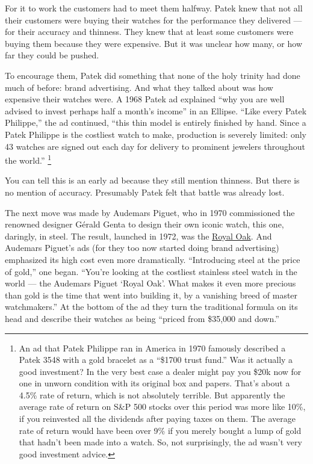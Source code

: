 For it to work the customers had to meet them halfway. Patek knew that
not all their customers were buying their watches for the performance
they delivered --- for their accuracy and thinness. They knew that at
least some customers were buying them because they were expensive. But
it was unclear how many, or how far they could be pushed.

To encourage them, Patek did something that none of the holy trinity had
done much of before: brand advertising. And what they talked about was
how expensive their watches were. A 1968 Patek ad explained ``why you
are well advised to invest perhaps half a month's income'' in an
Ellipse. ``Like every Patek Philippe,'' the ad continued, ``this thin
model is entirely finished by hand. Since a Patek Philippe is the
costliest watch to make, production is severely limited: only 43 watches
are signed out each day for delivery to prominent jewelers throughout
the world.'' \footnote{An ad that Patek Philippe ran in America in 1970 famously
described a Patek 3548 with a gold bracelet as a ``\$1700 trust fund.''
Was it actually a good investment? In the very best case a dealer might
pay you \$20k now for one in unworn condition with its original box and
papers. That's about a 4.5\% rate of return, which is not absolutely
terrible. But apparently the average rate of return on S\&P 500 stocks
over this period was more like 10\%, if you reinvested all the dividends
after paying taxes on them. The average rate of return would have been
over 9\% if you merely bought a lump of gold that hadn't been made into
a watch. So, not surprisingly, the ad wasn't very good investment
advice.}

You can tell this is an early ad because they still mention thinness.
But there is no mention of accuracy. Presumably Patek felt that battle
was already lost.

The next move was made by Audemars Piguet, who in 1970 commissioned the
renowned designer Gérald Genta to design their own iconic watch, this
one, daringly, in steel. The result, launched in 1972, was the
\href{https://www.sothebys.com/en/buy/auction/2025/fine-watches-5/reference-5402st-jumbo-royal-oak-a-series-a}{Royal
Oak}. And Audemars Piguet's ads (for they too now started doing brand
advertising) emphasized its high cost even more dramatically.
``Introducing steel at the price of gold,'' one began. ``You're looking
at the costliest stainless steel watch in the world --- the Audemars
Piguet `Royal Oak'. What makes it even more precious than gold is the
time that went into building it, by a vanishing breed of master
watchmakers.'' At the bottom of the ad they turn the traditional formula
on its head and describe their watches as being ``priced from \$35,000
and down.''

